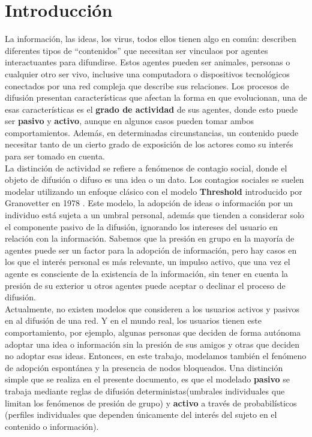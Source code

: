 \documentclass{article}
\begin{document}
\section{Introducción}
 La información, las ideas, los virus, todos ellos tienen algo en común: describen diferentes tipos de “contenidos” que necesitan ser vinculaos por agentes interactuantes para difundirse. Estos agentes pueden ser animales, personas o cualquier otro ser vivo, inclusive una computadora o dispositivos tecnológicos conectados por una red compleja que describe sus relaciones. Los procesos de difusión presentan características que afectan la forma en que evolucionan, una de esas características es el \textbf{grado de actividad} de sus agentes, donde esto puede ser \textbf{pasivo} y \textbf{activo}, aunque en algunos casos pueden tomar ambos comportamientos. Además, en determinadas circunstancias, un contenido puede necesitar tanto de un cierto grado de exposición de los actores como su interés para ser tomado en cuenta.
 \\
 La distinción de actividad se refiere a fenómenos de contagio social, donde el objeto de difusión o difuso es una idea o un dato. Los contagios sociales se suelen modelar utilizando un enfoque clásico con el modelo \textbf{Threshold} introducido por Granovetter en 1978 \cite{granovetter:1978}.
 Este modelo, la adopción de ideas o información por un individuo está sujeta a un umbral personal, además que tienden a considerar solo el componente pasivo de la difusión, ignorando los intereses del usuario en relación con la información.
 Sabemos que la presión en grupo en la mayoría de agentes puede ser un factor para la adopción de información, pero hay casos en los que el interés personal es más relevante, un impulso activo, que una vez el agente es consciente de la existencia de la información, sin tener en cuenta la presión de su exterior u otros agentes puede aceptar o declinar el proceso de difusión.
 \\
 Actualmente, no existen modelos que consideren a los usuarios activos y pasivos en al difusión de una red. Y en el mundo real, los usuarios tienen este comportamiento, por ejemplo, algunas personas que deciden de forma autónoma adoptar una idea o información sin la presión de sus amigos y otras que deciden no adoptar esas ideas. Entonces, en este trabajo, modelamos también el fenómeno de adopción espontánea y la presencia de nodos bloqueados. Una distinción simple que se realiza en el presente documento, es que el modelado \textbf{pasivo} se trabaja mediante reglas de difusión deterministas(umbrales individuales que limitan los fenómenos de presión de grupo) y \textbf{activo} a través de probabilísticos (perfiles individuales que dependen únicamente del interés del sujeto en el contenido o información).
\end{document}
